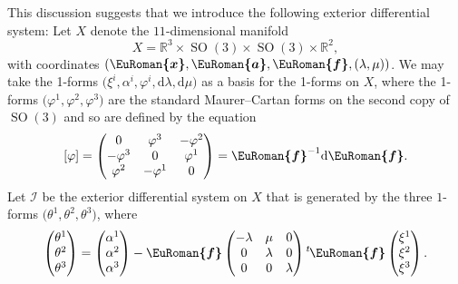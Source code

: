 \documentclass[pdftex]{sigma}
\numberwithin{equation}{section}
\newcommand{\eurom}{\EuRoman}
\renewcommand{\d}{\mathrm{d}}%
\newcommand{\cI}{{\mathcal I}}
\newcommand{\bbR}{{\mathbb R}}
\newcommand{\SO}{\operatorname{SO}}
\newcommand{\euroa}{\bm{\eurom{a}}}
\newcommand{\eurof}{\bm{\eurom{f}}}
\newcommand{\eurox}{\bm{\eurom{x}}}
\begin{document}
This discussion suggests that we introduce the following exterior differential system: Let $X$ denote the $11$-dimensional manifold
\[ X = \bbR^3 \times \SO(3) \times \SO(3) \times \bbR^2, \]
with coordinates $(\eurox, \euroa, \eurof, (\lambda, \mu))$. We may take the 1-forms
$\big(\xi^i, \alpha^i, \varphi^i, \d\lambda, \d\mu\big)$
as a basis for the 1-forms on $X$, where the 1-forms $\big(\varphi^1, \varphi^2, \varphi^3\big)$ are the standard Maurer--Cartan forms on the second copy of $\SO(3)$ and so are defined by the equation
\[ [\varphi] = \begin{pmatrix} 0 & \varphi^3 & -\varphi^2 \\ -\varphi^3 & 0 & \varphi^1 \\ \varphi^2 & -\varphi^1 & 0
\end{pmatrix} = \eurof^{-1} \d\eurof. \]
Let $\cI$ be the exterior differential system on $X$ that is generated by the three $1$-forms $\big(\theta^1, \theta^2, \theta^3\big)$, where
\[ \begin{pmatrix} \theta^1 \\ \theta^2 \\ \theta^3 \end{pmatrix} = \begin{pmatrix} \alpha^1 \\ \alpha^2 \\ \alpha^3 \end{pmatrix} - \eurof \begin{pmatrix} -\lambda & \mu & 0 \\ 0 & \lambda & 0 \\ 0 & 0 & \lambda \end{pmatrix} {}^t\hskip-1pt\eurof
\begin{pmatrix} \xi^1 \\ \xi^2 \\ \xi^3 \end{pmatrix}. \]
\end{document}

